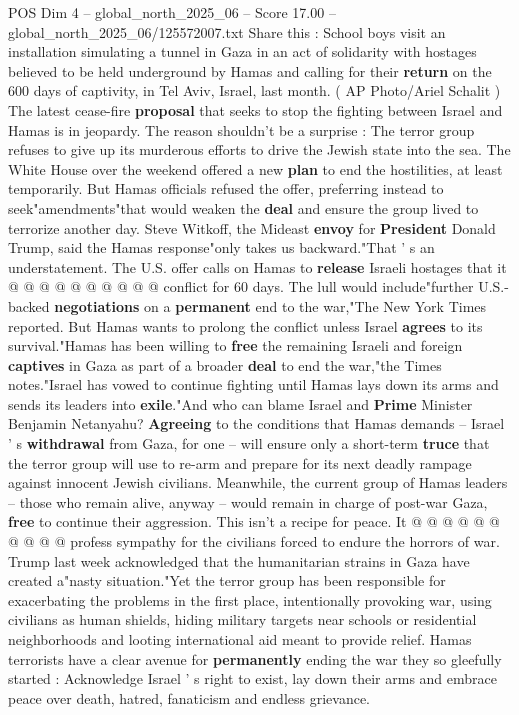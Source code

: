 \begin{textsample}{POS Dim 4 – global\_north\_2025\_06 – Score 17.00 – global\_north\_2025\_06/125572007.txt}  \label{ex:f4_pos_388}
Share this : School boys visit an installation simulating a tunnel in Gaza in an act of solidarity with hostages believed to be held underground by Hamas and calling for their \textbf{return} on the 600 days of captivity, in Tel Aviv, Israel, last month. ( AP Photo/Ariel Schalit ) The latest cease-fire \textbf{proposal} that seeks to stop the fighting between Israel and Hamas is in jeopardy.
The reason shouldn't be a surprise : The terror group refuses to give up its murderous efforts to drive the Jewish state into the sea.
The White House over the weekend offered a new \textbf{plan} to end the hostilities, at least temporarily.
But Hamas officials refused the offer, preferring instead to seek"amendments"that would weaken the \textbf{deal} and ensure the group lived to terrorize another day.
Steve Witkoff, the Mideast \textbf{envoy} for \textbf{President} Donald Trump, said the Hamas response"only takes us backward."That ' s an understatement.
The U.S. offer calls on Hamas to \textbf{release} Israeli hostages that it @ @ @ @ @ @ @ @ @ @ conflict for 60 days.
The lull would include"further U.S.-backed \textbf{negotiations} on a \textbf{permanent} end to the war,"The New York Times reported.
But Hamas wants to prolong the conflict unless Israel \textbf{agrees} to its survival."Hamas has been willing to \textbf{free} the remaining Israeli and foreign \textbf{captives} in Gaza as part of a broader \textbf{deal} to end the war,"the Times notes."Israel has vowed to continue fighting until Hamas lays down its arms and sends its leaders into \textbf{exile}."And who can blame Israel and \textbf{Prime} Minister Benjamin Netanyahu? \textbf{Agreeing} to the conditions that Hamas demands -- Israel ' s \textbf{withdrawal} from Gaza, for one -- will ensure only a short-term \textbf{truce} that the terror group will use to re-arm and prepare for its next deadly rampage against innocent Jewish civilians.
Meanwhile, the current group of Hamas leaders -- those who remain alive, anyway -- would remain in charge of post-war Gaza, \textbf{free} to continue their aggression.
This isn't a recipe for peace.
It @ @ @ @ @ @ @ @ @ @ profess sympathy for the civilians forced to endure the horrors of war.
Trump last week acknowledged that the humanitarian strains in Gaza have created a"nasty situation."Yet the terror group has been responsible for exacerbating the problems in the first place, intentionally provoking war, using civilians as human shields, hiding military targets near schools or residential neighborhoods and looting international aid meant to provide relief.
Hamas terrorists have a clear avenue for \textbf{permanently} ending the war they so gleefully started : Acknowledge Israel ' s right to exist, lay down their arms and embrace peace over death, hatred, fanaticism and endless grievance.

\end{textsample}
